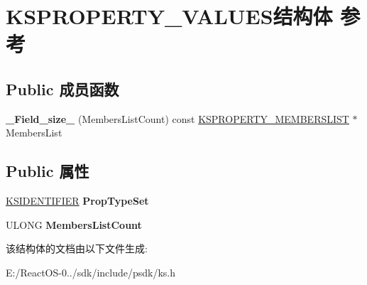 \hypertarget{struct_k_s_p_r_o_p_e_r_t_y___v_a_l_u_e_s}{}\section{K\+S\+P\+R\+O\+P\+E\+R\+T\+Y\+\_\+\+V\+A\+L\+U\+E\+S结构体 参考}
\label{struct_k_s_p_r_o_p_e_r_t_y___v_a_l_u_e_s}
\subsection*{Public 成员函数}
\begin{DoxyCompactItemize}
\item 
\mbox{\label{struct_k_s_p_r_o_p_e_r_t_y___v_a_l_u_e_s_a34f15e8e9de5ff3be7c94dd39673a7c0}} 
{\bfseries \+\_\+\+Field\+\_\+size\+\_\+} (Members\+List\+Count) const \hyperlink{struct_k_s_p_r_o_p_e_r_t_y___m_e_m_b_e_r_s_l_i_s_t}{K\+S\+P\+R\+O\+P\+E\+R\+T\+Y\+\_\+\+M\+E\+M\+B\+E\+R\+S\+L\+I\+ST} $\ast$Members\+List
\end{DoxyCompactItemize}
\subsection*{Public 属性}
\begin{DoxyCompactItemize}
\item 
\mbox{\label{struct_k_s_p_r_o_p_e_r_t_y___v_a_l_u_e_s_ae07197fd1392fe8b671716f6846adf19}} 
\hyperlink{struct_k_s_i_d_e_n_t_i_f_i_e_r}{K\+S\+I\+D\+E\+N\+T\+I\+F\+I\+ER} {\bfseries Prop\+Type\+Set}
\item 
\mbox{\label{struct_k_s_p_r_o_p_e_r_t_y___v_a_l_u_e_s_ae81f8cdb642df9ef35a9002b4f19a63f}} 
U\+L\+O\+NG {\bfseries Members\+List\+Count}
\end{DoxyCompactItemize}


该结构体的文档由以下文件生成\+:\begin{DoxyCompactItemize}
\item 
E\+:/\+React\+O\+S-\/0../sdk/include/psdk/ks.\+h\end{DoxyCompactItemize}
